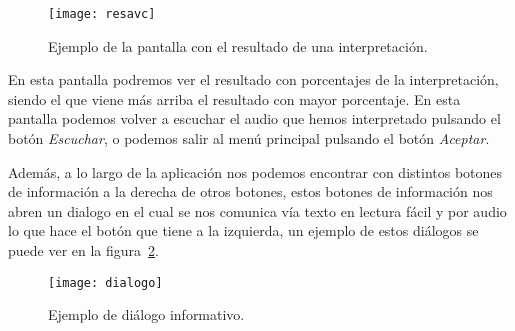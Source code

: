 \begin{figure}[H]
	\centering
	\texttt{[image: resavc]}
	\caption{Ejemplo de la pantalla con el resultado de una interpretación.}
	\label{fig:resavc}
\end{figure}

En esta pantalla podremos ver el resultado con porcentajes de la interpretación, siendo el que viene más arriba el resultado con mayor porcentaje. En esta pantalla podemos volver a escuchar el audio que hemos interpretado pulsando el botón \textit{Escuchar}, o podemos salir al menú principal pulsando el botón \textit{Aceptar}.

Además, a lo largo de la aplicación nos podemos encontrar con distintos botones de información a la derecha de otros botones, estos botones de información nos abren un dialogo en el cual se nos comunica vía texto en lectura fácil y por audio lo que hace el botón que tiene a la izquierda, un ejemplo de estos diálogos se puede ver en la figura~\ref{fig:diaavc}.

\begin{figure}[H]
	\centering
	\texttt{[image: dialogo]}
	\caption{Ejemplo de diálogo informativo.}
	\label{fig:diaavc}
\end{figure}